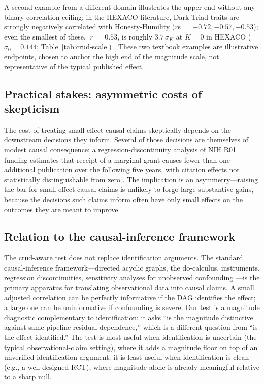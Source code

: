 A second example from a different domain illustrates the upper end without any binary-correlation ceiling: in the HEXACO literature, Dark Triad traits are strongly negatively correlated with Honesty-Humility ($r$s $= -0.72, -0.57, -0.53$); even the smallest of these, $|r|=0.53$, is roughly $3.7\,\sigma_K$ at $K=0$ in HEXACO ($\sigma_0=0.144$; Table~\ref{tab:crud-scale}) \citep{lee2005}. These two textbook examples are illustrative endpoints, chosen to anchor the high end of the magnitude scale, not representative of the typical published effect.

\subsection{Practical stakes: asymmetric costs of skepticism}
\label{si:practical-stakes}

The cost of treating small-effect causal claims skeptically depends on the downstream decisions they inform. Several of those decisions are themselves of modest causal consequence: a regression-discontinuity analysis of NIH R01 funding estimates that receipt of a marginal grant causes fewer than one additional publication over the following five years, with citation effects not statistically distinguishable from zero \citep{jacob2011}. The implication is an asymmetry---raising the bar for small-effect causal claims is unlikely to forgo large substantive gains, because the decisions such claims inform often have only small effects on the outcomes they are meant to improve.

\subsection{Relation to the causal-inference framework}
\label{si:causal-inference-framework}

The crud-aware test does not replace identification arguments. The standard causal-inference framework---directed acyclic graphs, the do-calculus, instruments, regression discontinuities, sensitivity analyses for unobserved confounding \citep{pearl2009,imbens_rubin2015,cinelli2020,oster2019}---is the primary apparatus for translating observational data into causal claims. A small adjusted correlation can be perfectly informative if the DAG identifies the effect; a large one can be uninformative if confounding is severe. Our test is a magnitude diagnostic complementary to identification: it asks ``is the magnitude distinctive against same-pipeline residual dependence,'' which is a different question from ``is the effect identified.'' The test is most useful when identification is uncertain (the typical observational-claim setting), where it adds a magnitude floor on top of an unverified identification argument; it is least useful when identification is clean (e.g., a well-designed RCT), where magnitude alone is already meaningful relative to a sharp null.

